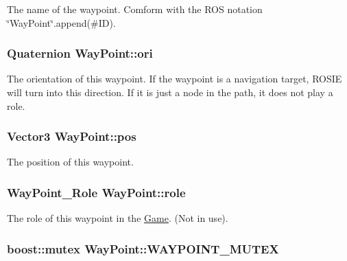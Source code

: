 \-The name of the waypoint. \-Comform with the \-R\-O\-S notation \char`\"{}\-Way\-Point\char`\"{}.append(\#\-I\-D). \hypertarget{classWayPoint_a5335f01d55f54a40acf21fa25d93efc0}{
\subsubsection[{ori}]{\setlength{\rightskip}{0pt plus 5cm}\-Quaternion {\bf \-Way\-Point\-::ori}}}\label{classWayPoint_a5335f01d55f54a40acf21fa25d93efc0}
\-The orientation of this waypoint. \-If the waypoint is a navigation target, \-R\-O\-S\-I\-E will turn into this direction. \-If it is just a node in the path, it does not play a role. \hypertarget{classWayPoint_aaace5c39e2b733295ef37de4228eb115}{
\subsubsection[{pos}]{\setlength{\rightskip}{0pt plus 5cm}\-Vector3 {\bf \-Way\-Point\-::pos}}}\label{classWayPoint_aaace5c39e2b733295ef37de4228eb115}
\-The position of this waypoint. \hypertarget{classWayPoint_aed5b54453c7dc642ee8125158942ccd0}{
\subsubsection[{role}]{\setlength{\rightskip}{0pt plus 5cm}\-Way\-Point\-\_\-\-Role {\bf \-Way\-Point\-::role}}}\label{classWayPoint_aed5b54453c7dc642ee8125158942ccd0}
\-The role of this waypoint in the \hyperlink{classGame}{\-Game}. (\-Not in use). \hypertarget{classWayPoint_ac889b89eb8c36244c7b937bed5c2d77e}{
\subsubsection[{\-W\-A\-Y\-P\-O\-I\-N\-T\-\_\-\-M\-U\-T\-E\-X}]{\setlength{\rightskip}{0pt plus 5cm}boost\-::mutex {\bf \-Way\-Point\-::\-W\-A\-Y\-P\-O\-I\-N\-T\-\_\-\-M\-U\-T\-E\-X}}}\label{classWayPoint_ac889b89eb8c36244c7b937bed5c2d77e}
